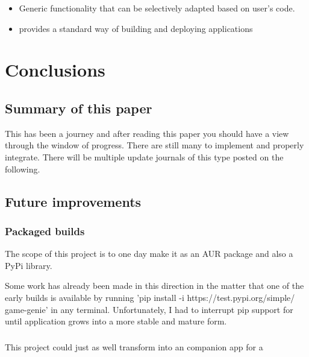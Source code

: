             \begin{itemize}
                \item Generic functionality that can be selectively adapted based on user's code.
                \item provides a standard way of building and deploying applications
            \end{itemize}


\chapter{Conclusions}
    
    \section{Summary of this paper}
        This has been a journey and after reading this paper you should have a view through the window of progress. There are still many to implement and properly integrate. There will be multiple update journals of this type posted on the following.

    \section{Future improvements}
        

        \subsection{Packaged builds}
            The scope of this project is to one day make it as an AUR package and also a PyPi library.

            Some work has already been made in this direction in the matter that one of the early builds is available by running 'pip install -i https://test.pypi.org/simple/ game-genie' in any terminal.
            Unfortunately, I had to interrupt pip support for until application grows into a more stable and mature form.


        \subsection{}
            This project could just as well transform into an companion app for a 

            
